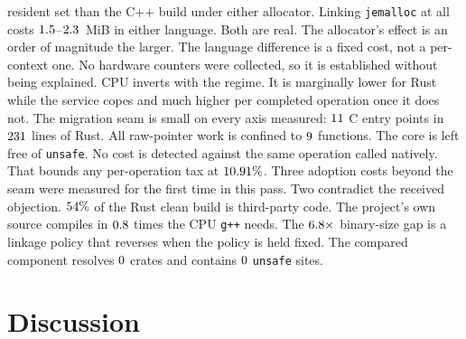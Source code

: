 \documentclass[english,twoside,openright,a4paper,censored,csm,software-track-2020]{HYthesisML}
\begin{document}
\begin{itemize}
        resident set than the C++ build under either allocator. Linking \texttt{jemalloc} at all
        costs $1.5$--$2.3$~MiB in either language. Both are real. The
        allocator's effect is an order of magnitude the larger. The language difference is a
        fixed cost, not a per-context one. No hardware counters were collected, so it is
        established without being explained. CPU inverts with the regime. It is marginally lower
        for Rust while the service copes and much higher per completed operation once it does
        not. The migration seam is small on every axis measured: $11$ C entry
        points in $231$ lines of Rust. All raw-pointer work is confined to
        $9$ functions. The core is left free of \texttt{unsafe}. No cost is detected
        against the same operation called natively. That bounds any per-operation tax at
        $10.91\%$. Three adoption costs beyond the seam were measured for the first time
        in this pass. Two contradict the received objection. $54\%$ of the Rust
        clean build is third-party code. The project's own source compiles in
        $0.8$ times the CPU \texttt{g++} needs. The
        $6.8\times$ binary-size gap is a linkage policy that reverses when the
        policy is held fixed. The compared component resolves $0$ crates and contains
        $0$ \texttt{unsafe} sites.
\end{itemize}

\chapter{Discussion\label{chapter:discussion}}
\end{document}
